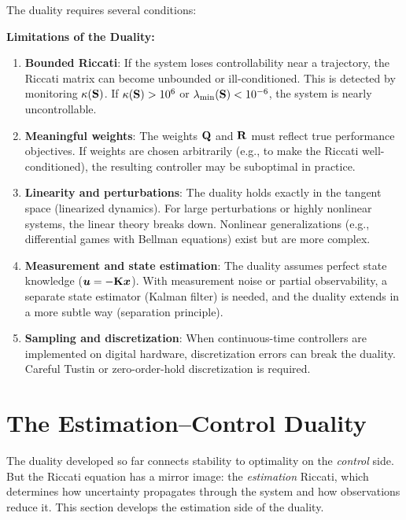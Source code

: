 The duality requires several conditions:

\begin{warningbox}
\textbf{Limitations of the Duality:}
\begin{enumerate}
\item \textbf{Bounded Riccati}: If the system loses controllability near a trajectory, the Riccati matrix can become
      unbounded or ill-conditioned. This is detected by monitoring $\kappa(\mathbf{S})$. If $\kappa(\mathbf{S}) > 10^6$ or
      $\lambda_{\min}(\mathbf{S}) < 10^{-6}$, the system is nearly uncontrollable.

\item \textbf{Meaningful weights}: The weights $\mathbf{Q}$ and $\mathbf{R}$ must reflect true performance objectives. If
      weights are chosen arbitrarily (e.g., to make the Riccati well-conditioned), the resulting controller may be
      suboptimal in practice.

\item \textbf{Linearity and perturbations}: The duality holds exactly in the tangent space (linearized dynamics). For
      large perturbations or highly nonlinear systems, the linear theory breaks down. Nonlinear generalizations (e.g.,
      differential games with Bellman equations) exist but are more complex.

\item \textbf{Measurement and state estimation}: The duality assumes perfect state knowledge ($\bm{u} = -\mathbf{K}\bm{x}$). With
      measurement noise or partial observability, a separate state estimator (Kalman filter) is needed, and the
      duality extends in a more subtle way (separation principle).

\item \textbf{Sampling and discretization}: When continuous-time controllers are implemented on digital hardware,
      discretization errors can break the duality. Careful Tustin or zero-order-hold discretization is required.
\end{enumerate}
\end{warningbox}

\section{The Estimation--Control Duality}

The duality developed so far connects stability to optimality on the \emph{control} side.
But the Riccati equation has a mirror image: the \emph{estimation} Riccati, which
determines how uncertainty propagates through the system and how observations reduce it.
This section develops the estimation side of the duality.

